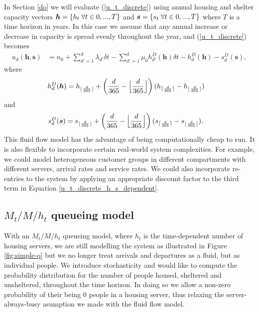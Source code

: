 \documentclass[12pt,a4paper]{article}
\begin{document}
In Section \ref{do} we will evaluate (\ref{u_t_discrete}) using annual housing and shelter capacity vectors $\boldsymbol{h} = \{h_t \hspace{0.1cm} \forall t \in 0,...,T\}$ and $\boldsymbol{s} = \{s_t \hspace{0.1cm} \forall t \in 0,...,T\}$ where $T$ is a time horizon in years. In this case we assume that any annual increase or decrease in capacity is spread evenly throughout the year, and (\ref{u_t_discrete}) becomes
%
\begin{align} \label{u_t_discrete_h_s_dependent}
u_d(\boldsymbol{h},\boldsymbol{s}) & = n_0 + \sum_{d'=1}^{d} \lambda_{d'} \delta t - \sum_{d'=1}^{d} \mu_0 h^D_{d'}(\boldsymbol{h}) \delta t - h^D_d(\boldsymbol{h}) - s^D_d(\boldsymbol{s}),
\end{align}
%
where 
%
\begin{align} \label{h_d}
h^D_d(\boldsymbol{h}) & = h_{\lfloor{\frac{d}{365}}\rfloor} + \left( \frac{d}{365} - \Bigl\lfloor\frac{d}{365}\Bigr\rfloor \right)(h_{\lceil{\frac{d}{365}}\rceil}-h_{\lfloor{\frac{d}{365}}\rfloor})
\end{align}
%
and
%
\begin{align} \label{s_d}
s^D_d(\boldsymbol{s}) & = s_{\lfloor{\frac{d}{365}}\rfloor} + \left( \frac{d}{365} - \Bigl\lfloor\frac{d}{365}\Bigr\rfloor \right)(s_{\lceil{\frac{d}{365}}\rceil}-s_{\lfloor{\frac{d}{365}}\rfloor}).
\end{align}
%
This fluid flow model has the advantage of being computationally cheap to run. It is also flexible to incorporate certain real-world system complexities. For example, we could model heterogeneous customer groups in different compartments with different servers, arrival rates and service rates. We could also incorporate re-entries to the system by applying an appropriate discount factor to the third term in Equation \ref{u_t_discrete_h_s_dependent}. 

\subsection{$M_t/M/h_t$ queueing model}
%
With an $M_t/M/h_t$ queueing model, where $h_t$ is the time-dependent number of housing servers, we are still modelling the system as illustrated in Figure \ref{fig:simple-q} but we no longer treat arrivals and departures as a fluid, but as individual people. We introduce stochasticity and would like to compute the probability distribution for the number of people housed, sheltered and unsheltered, throughout the time horizon. In doing so we allow a non-zero probability of their being $0$ people in a housing server, thus relaxing the server-always-busy asumption we made with the fluid flow model.
\end{document}

